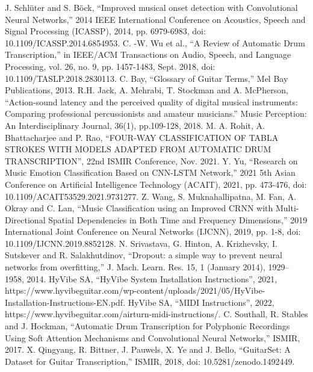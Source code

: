 \documentclass[conference]{IEEEtran}
\begin{document}
\begin{thebibliography}{00}
 J. Schlüter and S. Böck, ``Improved musical onset detection with Convolutional Neural Networks,'' 2014 IEEE International Conference on Acoustics, Speech and Signal Processing (ICASSP), 2014, pp. 6979-6983, doi: 10.1109/ICASSP.2014.6854953.
 C. -W. Wu et al., ``A Review of Automatic Drum Transcription,'' in IEEE/ACM Transactions on Audio, Speech, and Language Processing, vol. 26, no. 9, pp. 1457-1483, Sept. 2018, doi: 10.1109/TASLP.2018.2830113.
 C. Bay, ``Glossary of Guitar Terms,'' Mel Bay Publications, 2013.
 R.H. Jack, A. Mehrabi, T. Stockman and A. McPherson, ``Action-sound latency and the perceived quality of digital musical instruments: Comparing professional percussionists and amateur musicians.'' Music Perception: An Interdisciplinary Journal, 36(1), pp.109-128, 2018.
 M. A. Rohit, A. Bhattacharjee and P. Rao, ``FOUR-WAY CLASSIFICATION OF TABLA STROKES WITH MODELS ADAPTED FROM AUTOMATIC DRUM TRANSCRIPTION'', 22nd ISMIR Conference, Nov. 2021.
 Y. Yu, ``Research on Music Emotion Classification Based on CNN-LSTM Network,'' 2021 5th Asian Conference on Artificial Intelligence Technology (ACAIT), 2021, pp. 473-476, doi: 10.1109/ACAIT53529.2021.9731277.
 Z. Wang, S. Muknahallipatna, M. Fan, A. Okray and C. Lan, ``Music Classification using an Improved CRNN with Multi-Directional Spatial Dependencies in Both Time and Frequency Dimensions,'' 2019 International Joint Conference on Neural Networks (IJCNN), 2019, pp. 1-8, doi: 10.1109/IJCNN.2019.8852128.
 N. Srivastava, G. Hinton, A. Krizhevsky, I. Sutskever and R. Salakhutdinov, ``Dropout: a simple way to prevent neural networks from overfitting,'' J. Mach. Learn. Res. 15, 1 (January 2014), 1929–1958, 2014.
 HyVibe SA, ``HyVibe System Installation Instructions'', 2021, https://www.hyvibeguitar.com/wp-content/uploads/2021/05/HyVibe-Installation-Instructions-EN.pdf.
 HyVibe SA, ``MIDI Instructions'', 2022, https://www.hyvibeguitar.com/airturn-midi-instructions/.
 C. Southall, R. Stables and J. Hockman, ``Automatic Drum Transcription for Polyphonic Recordings Using Soft Attention Mechanisms and Convolutional Neural Networks,'' ISMIR, 2017.
 X. Qingyang, R. Bittner, J. Pauwels, X. Ye and J. Bello, ``GuitarSet: A Dataset for Guitar Transcription,'' ISMIR, 2018, doi: 10.5281/zenodo.1492449.

\end{thebibliography}
\vspace{12pt}
\end{document}
